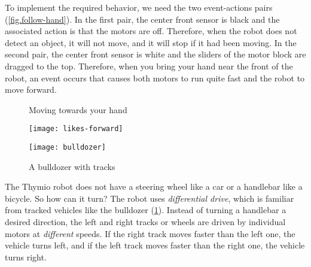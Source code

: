
To implement the required behavior, we need the two event-actions pairs
(\cref{fig.follow-hand}). In the first pair, the center front sensor is
black and the associated action is that the motors are off. Therefore,
when the robot does not detect an object, it will not move, and it will
stop if it had been moving. In the second pair, the center front sensor
is white and the sliders of the motor block are dragged to the top.
Therefore, when you bring your hand near the front of the robot, an
event occurs that causes both motors to run quite fast and the robot to
move forward.

\begin{figure}
\begin{floatrow}
	\ffigbox
	{\caption{Moving towards your hand}\label{fig.follow-hand}}
	{\texttt{[image: likes-forward]}}
	\ffigbox
	{\caption{A bulldozer with tracks}\label{fig.bull}}
	{\texttt{[image: bulldozer]}}
\end{floatrow}
\end{figure}


The Thymio robot does not have a steering wheel like a car or a
handlebar like a bicycle. So how can it turn? The robot uses
\emph{differential drive}, which is familiar from tracked vehicles like
the bulldozer (\cref{fig.bull}). Instead of turning a handlebar a
desired direction, the left and right tracks or wheels are driven by
individual motors at \emph{different} speeds. If the right track moves
faster than the left one, the vehicle turns left, and if the left track
moves faster than the right one, the vehicle turns right.

